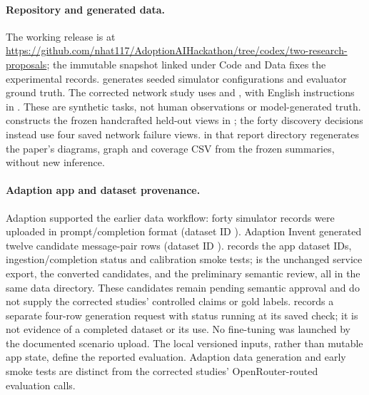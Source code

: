 \documentclass[11pt]{article}
\begin{document}
\paragraph{Repository and generated data.}
The working release is at \url{https://github.com/nhat117/AdoptionAIHackathon/tree/codex/two-research-proposals}; the immutable snapshot linked under Code and Data fixes the experimental records.  generates seeded simulator configurations and evaluator ground truth. The corrected network study uses  and , with English instructions in . These are synthetic tasks, not human observations or model-generated truth.  constructs the frozen handcrafted held-out views in ; the forty discovery decisions instead use four saved network failure views.  in that report directory regenerates the paper's diagrams, graph and coverage CSV from the frozen summaries, without new inference.

\paragraph{Adaption app and dataset provenance.}
Adaption supported the earlier data workflow: forty simulator records were uploaded in prompt/completion format (dataset ID ). Adaption Invent generated twelve candidate message-pair rows (dataset ID ).  records the app dataset IDs, ingestion/completion status and calibration smoke tests;  is the unchanged service export,  the converted candidates, and  the preliminary semantic review, all in the same data directory. These candidates remain pending semantic approval and do not supply the corrected studies' controlled claims or gold labels.  records a separate four-row generation request with status running at its saved check; it is not evidence of a completed dataset or its use. No fine-tuning was launched by the documented scenario upload. The local versioned inputs, rather than mutable app state, define the reported evaluation. Adaption data generation and early smoke tests are distinct from the corrected studies' OpenRouter-routed evaluation calls.
\end{document}
